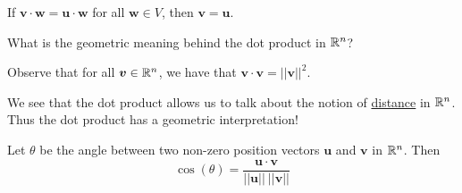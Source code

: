     
    \begin{corollary}
    If $ \bm{v} \cdot \bm{w} = \bm{u} \cdot \bm{w}$ for all $\bm{w} \in V$, then $\bm{v} = \bm{u}$.
    \end{corollary}

\begin{motivating}
What is the geometric meaning behind the dot product in $\mathbb{R}^n$?
\end{motivating}


\begin{proposition}
    Observe that for all $\bm{v} \in \mathbb{R}^n$, we have that $\bm{v} \cdot \bm{v} = ||\bm{v}||^2$. 
\end{proposition}
    
    We see that the dot product allows us to talk about the notion of \underline{distance} in $\mathbb{R}^n$.  Thus the dot product has a geometric interpretation!
    
\begin{proposition}\label{geometricdotproduct}
    Let $\theta$ be the angle between two non-zero position vectors $\bm{u}$ and $\bm{v}$ in $\mathbb{R}^n$.  Then  $$\cos(\theta) = \frac{\bm{u} \cdot \bm{v}}{||\bm{u}|| \ ||\bm{v}||}$$
    \end{proposition}

